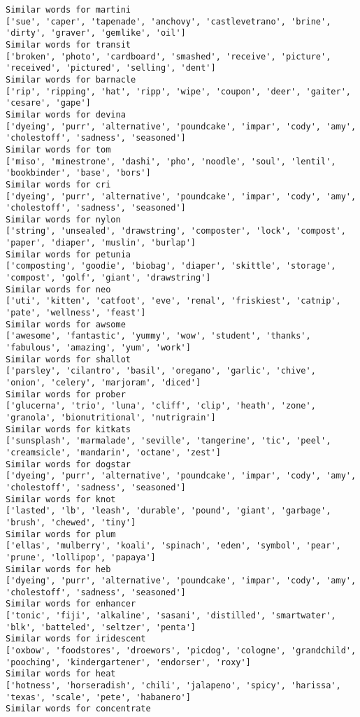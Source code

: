 \documentclass[11pt]{article}
\begin{document}
\begin{Verbatim}[commandchars=\\\{\}]
Similar words for martini
['sue', 'caper', 'tapenade', 'anchovy', 'castlevetrano', 'brine', 'dirty', 'graver', 'gemlike', 'oil']
Similar words for transit
['broken', 'photo', 'cardboard', 'smashed', 'receive', 'picture', 'received', 'pictured', 'selling', 'dent']
Similar words for barnacle
['rip', 'ripping', 'hat', 'ripp', 'wipe', 'coupon', 'deer', 'gaiter', 'cesare', 'gape']
Similar words for devina
['dyeing', 'purr', 'alternative', 'poundcake', 'impar', 'cody', 'amy', 'cholestoff', 'sadness', 'seasoned']
Similar words for tom
['miso', 'minestrone', 'dashi', 'pho', 'noodle', 'soul', 'lentil', 'bookbinder', 'base', 'bors']
Similar words for cri
['dyeing', 'purr', 'alternative', 'poundcake', 'impar', 'cody', 'amy', 'cholestoff', 'sadness', 'seasoned']
Similar words for nylon
['string', 'unsealed', 'drawstring', 'composter', 'lock', 'compost', 'paper', 'diaper', 'muslin', 'burlap']
Similar words for petunia
['composting', 'goodie', 'biobag', 'diaper', 'skittle', 'storage', 'compost', 'golf', 'giant', 'drawstring']
Similar words for neo
['uti', 'kitten', 'catfoot', 'eve', 'renal', 'friskiest', 'catnip', 'pate', 'wellness', 'feast']
Similar words for awsome
['awesome', 'fantastic', 'yummy', 'wow', 'student', 'thanks', 'fabulous', 'amazing', 'yum', 'work']
Similar words for shallot
['parsley', 'cilantro', 'basil', 'oregano', 'garlic', 'chive', 'onion', 'celery', 'marjoram', 'diced']
Similar words for prober
['glucerna', 'trio', 'luna', 'cliff', 'clip', 'heath', 'zone', 'granola', 'bionutritional', 'nutrigrain']
Similar words for kitkats
['sunsplash', 'marmalade', 'seville', 'tangerine', 'tic', 'peel', 'creamsicle', 'mandarin', 'octane', 'zest']
Similar words for dogstar
['dyeing', 'purr', 'alternative', 'poundcake', 'impar', 'cody', 'amy', 'cholestoff', 'sadness', 'seasoned']
Similar words for knot
['lasted', 'lb', 'leash', 'durable', 'pound', 'giant', 'garbage', 'brush', 'chewed', 'tiny']
Similar words for plum
['ellas', 'mulberry', 'koali', 'spinach', 'eden', 'symbol', 'pear', 'prune', 'lollipop', 'papaya']
Similar words for heb
['dyeing', 'purr', 'alternative', 'poundcake', 'impar', 'cody', 'amy', 'cholestoff', 'sadness', 'seasoned']
Similar words for enhancer
['tonic', 'fiji', 'alkaline', 'sasani', 'distilled', 'smartwater', 'blk', 'batteled', 'seltzer', 'penta']
Similar words for iridescent
['oxbow', 'foodstores', 'droewors', 'picdog', 'cologne', 'grandchild', 'pooching', 'kindergartener', 'endorser', 'roxy']
Similar words for heat
['hotness', 'horseradish', 'chili', 'jalapeno', 'spicy', 'harissa', 'texas', 'scale', 'pete', 'habanero']
Similar words for concentrate

\end{Verbatim}
\end{document}
